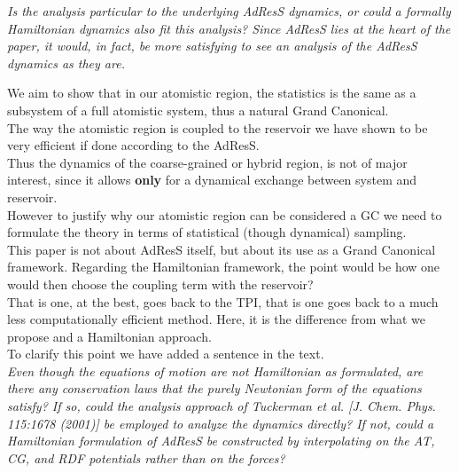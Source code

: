 \documentclass[12pt]{article}
\newcommand{\bluec}[1]{{\color{blue} #1}}
\begin{document}
{\color{red} {\it Is the analysis particular to the underlying AdResS
dynamics, or could a formally Hamiltonian dynamics also fit this analysis? Since AdResS lies at the heart
of the paper, it would, in fact, be more satisfying to see an analysis of the AdResS dynamics as they are.}}

We aim to show that in our atomistic region, the statistics is the same as a subsystem of a full atomistic system, thus a natural Grand Canonical.\\
The way the atomistic region is coupled to the reservoir we have shown to be very efficient if done according to the AdResS.\\
Thus the dynamics of the coarse-grained or hybrid region, is not of major interest, since it allows {\bf only} for a dynamical exchange between system and reservoir.\\
However to justify why our atomistic region can be considered a GC we need to formulate the theory in terms of statistical (though dynamical) sampling.\\
This paper is not about AdResS itself, but about its use as a Grand Canonical framework. Regarding the Hamiltonian framework, the point would be how one would then choose the coupling term with the reservoir?\\
That is one, at the best, goes back to the \bluec{TPI}, that is one goes back to a much less computationally efficient method. Here, it is the difference from what we propose and a Hamiltonian approach.\\
To clarify this point we have added a sentence in the text.\\

{\color{red} {\it Even though the equations of motion are not Hamiltonian as formulated, are there any conservation laws
that the purely Newtonian form of the equations satisfy? If so, could the analysis approach of Tuckerman
et al. [J. Chem. Phys. 115:1678 (2001)] be employed to analyze the dynamics directly? If not, could a
Hamiltonian formulation of AdResS be constructed by interpolating on the AT, CG, and RDF potentials
rather than on the forces?}}\\
\end{document}
